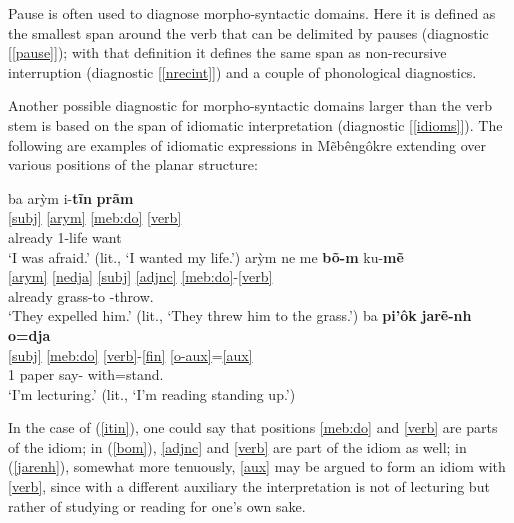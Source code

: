 \documentclass[output=paper]{langscibook}
\begin{document}
Pause is often used to diagnose morpho-syntactic domains. Here it is defined as the smallest span around the verb that can be delimited by pauses (diagnostic [\ref{pause}]); with that definition it defines the same span as non-recursive interruption (diagnostic [\ref{nrecint}]) and a couple of phonological diagnostics.

Another possible diagnostic for morpho-syntactic domains larger than the verb stem is based on the span of idiomatic interpretation (diagnostic [\ref{idioms}]). The following are examples of idiomatic expressions in Mẽbêngôkre extending over various positions of the planar structure:

\ea
    \ea\label{itin}\glll ba arỳm i-{\bfseries tĩn} {\bfseries prãm}\\
         \ref{subj} \ref{arym} \ref{meb:do} \ref{verb}\\
          already 1-life want\\
      \glt `I was afraid.' (lit., `I wanted my life.')
    \ex\label{bom}\glll arỳm ne me {\bfseries bõ-m} ku-{\bfseries mẽ}\\
         \ref{arym} \ref{nedja} \ref{subj} \ref{adjnc} \ref{meb:do}-\ref{verb}\\
         already   grass-to -throw.\\
      \glt `They expelled him.' (lit., `They threw him to the grass.')
    \ex\label{jarenh}\glll ba {\bfseries pi'ôk} {\bfseries jarẽ-nh} {\bfseries o=dja}\\
         \ref{subj} \ref{meb:do} \ref{verb}-\ref{fin} \ref{o-aux}=\ref{aux}\\
         1\Nom{} paper say-\Nfin{} with=stand.\\
      \glt `I'm lecturing.' (lit., `I'm reading standing up.')
    \z
\z

In the case of (\ref{itin}), one could say that positions \ref{meb:do} and \ref{verb} are parts of the idiom;
in (\ref{bom}), \ref{adjnc} and \ref{verb} are part of the idiom as well;
in (\ref{jarenh}), somewhat more tenuously, \ref{aux} may be argued to form an idiom with \ref{verb}, since with a different auxiliary the interpretation is not of lecturing but rather of studying or reading for one's own sake.
\end{document}
